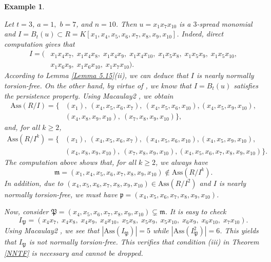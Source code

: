 \documentclass[11pt]{amsart}
\newtheorem{example}[theorem]{Example}
\begin{document}
 

 
\begin{example}
\em{
Let $t=3$, $a=1,$ $b=7$, and $n=10$. Then  $u=x_1x_7x_{10}$ is  a $3$-spread monomial and 
$I=B_t(u)\subset R=K[x_1, x_4, x_5,x_6, x_7, x_8,x_9, x_{10}]$.  Indeed, direct computation gives that 
 \begin{align*}
 I=(&x_1x_4x_7,\; x_1x_4x_8,\; x_1x_4x_9,\; x_1x_4x_{10},\; x_1x_5x_8,\; x_1x_5x_9,\; x_1x_5x_{10},\\
 & x_1x_6x_9,\; x_1x_6x_{10}, \; x_1x_7x_{10}).
 \end{align*}
 According to Lemma \ref{Lemma 5.15}(ii), we can deduce that $I$  is nearly normally torsion-free. 
 On the other hand, by virtue of \cite[Corollary 2.6]{AEL}, we know that $I=B_t(u)$  satisfies the persistence property.  
  Using Macaulay2 \cite{GS}, we obtain 
\begin{align*}
\mathrm{Ass}(R/I) = \{& (x_1),\ (x_4,x_5,x_6,x_7),\ (x_4,x_5,x_6,x_{10}), (x_4,x_5,x_9,x_{10}),\\ 
&(x_4,x_8,x_9,x_{10}),\ (x_7,x_8,x_9,x_{10})\},
\end{align*}
and, for all $k\geq 2$, 
\begin{align*}
\mathrm{Ass}(R/I^k) = \{& (x_1),\ (x_4,x_5,x_6,x_7),\ (x_4,x_5,x_6,x_{10}), (x_4,x_5,x_9,x_{10}),\\
& (x_4,x_8,x_9,x_{10}),\ (x_7,x_8,x_9,x_{10}), (x_4,x_5,x_6,x_7,x_8,x_9,x_{10})\}.
\end{align*}
The computation above shows that, for all $k\geq 2$, we always have 
 $$\mathfrak{m}=(x_1, x_4, x_5,x_6, x_7, x_8,x_9, x_{10})\notin \mathrm{Ass}(R/I^k).$$
 In addition, due to  $(x_4, x_5,x_6, x_7, x_8,x_9, x_{10})\in \mathrm{Ass}(R/I^2)$ and  $I$  is nearly normally torsion-free, we must have 
 $\mathfrak{p}=(x_4, x_5,x_6, x_7, x_8,x_9, x_{10})$.
 
 Now, consider $\mathfrak{P}=(x_4, x_5,x_6, x_7, x_8,x_9, x_{10})\subsetneq \mathfrak{m}$. It is easy to check  
  $$I_{\mathfrak{P}}=(x_4x_7,\; x_4x_8,\; x_4x_9,\; x_4x_{10},\; x_5x_8,\; x_5x_9,\; x_5x_{10},\;
 x_6x_9,\; x_6x_{10}, \; x_7x_{10}).$$
  Using Macaulay2 \cite{GS}, we see that  $|\mathrm{Ass}(I_{\mathfrak{P}})|=5$ while $|\mathrm{Ass}(I_{\mathfrak{P}}^2)|=6$. This yields that 
 $I_{\mathfrak{P}}$ is not normally torsion-free.   
This verifies that  condition (iii)  in Theorem \ref{NNTF} is necessary  and cannot be dropped.  
}
\end{example}
\end{document}

